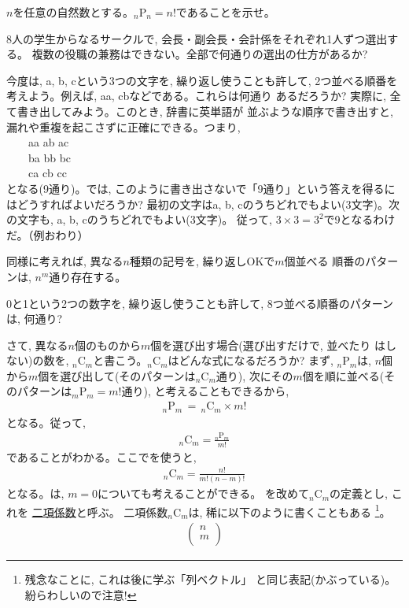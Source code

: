 \begin{q}\label{q:alg_comb00} $n$を任意の自然数とする。$_n\text{P}_n = n!$であることを示せ。\end{q}

\begin{q}\label{q:alg_comb0}
 8人の学生からなるサークルで, 会長・副会長・会計係をそれぞれ1人ずつ選出する。
複数の役職の兼務はできない。全部で何通りの選出の仕方があるか?
\end{q}

\begin{exmpl} 今度は, a, b, cという3つの文字を, 繰り返し使うことも許して, 
2つ並べる順番を考えよう。例えば, aa, cbなどである。これらは何通り
あるだろうか? 実際に, 全て書き出してみよう。このとき, 辞書に英単語が
並ぶような順序で書き出すと, 漏れや重複を起こさずに正確にできる。つまり,\\ 
　　aa ab ac\\
　　ba bb bc\\
　　ca cb cc\\
となる(9通り)。では, このように書き出さないで「9通り」という答えを得るにはどうすればよいだろうか? 
最初の文字はa, b, cのうちどれでもよい(3文字)。次の文字も, a, b, cのうちどれでもよい(3文字)。
従って, $3 \times 3=3^2$で9となるわけだ。（例おわり）
\end{exmpl}

同様に考えれば, 異なる$n$種類の記号を, 繰り返しOKで$m$個並べる
順番のパターンは, $n^m$通り存在する。

\begin{q}\label{q:alg_01_8}
 0と1という2つの数字を, 繰り返し使うことも許して, 8つ並べる順番のパターンは, 何通り?
\end{q}

さて, 異なる$n$個のものから$m$個を選び出す場合(選び出すだけで, 並べたり
はしない)の数を, $_n$C$_m$と書こう。$_n$C$_m$はどんな式になるだろうか?
まず, $_n$P$_m$は, $n$個から$m$個を選び出して(そのパターンは$_n$C$_m$通り), 
次にその$m$個を順に並べる(そのパターンは$_m$P$_m=m!$通り), と考えることもできるから, 
\begin{eqnarray}_n\text{P}_m\,=\,_n\text{C}_m \times m! \end{eqnarray}
となる。従って, 
\begin{eqnarray}_n\text{C}_m = \frac{_n\text{P}_m}{m!}\end{eqnarray}
であることがわかる。ここでを使うと, 
\begin{eqnarray}
_n\text{C}_m = \frac{n!}{m!(n-m)!} \label{eq:combination}
\end{eqnarray}
となる。は, $m=0$についても考えることができる。
を改めて$_n$C$_m$の定義とし, これを
\underline{二項係数}と呼ぶ。
二項係数$_n$C$_m$は, 稀に以下のように書くこともある
\footnote{残念なことに, これは後に学ぶ「列ベクトル」
と同じ表記(かぶっている)。紛らわしいので注意!}。
\begin{eqnarray}
\left(
\begin{array}{c}
n\\
m\\
\end{array}
\right) 
\end{eqnarray}

